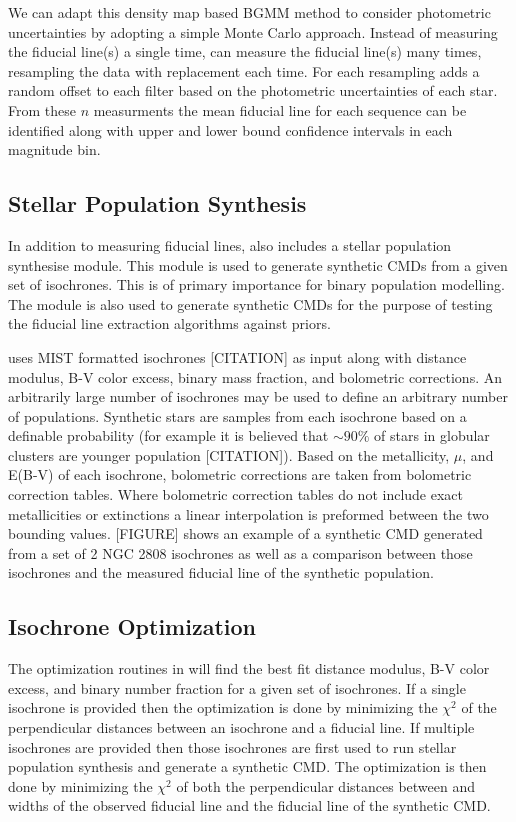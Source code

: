 We can adapt this density map based BGMM method to consider photometric
uncertainties by adopting a simple Monte Carlo approach. Instead of measuring
the fiducial line(s) a single time, \fidanka can measure the fiducial line(s)
many times, resampling the data with replacement each time. For each resampling
\fidanka adds a random offset to each filter based on the photometric
uncertainties of each star. From these $n$ measurments the mean fiducial line
for each sequence can be identified along with upper and lower bound confidence
intervals in each magnitude bin.

\subsection{Stellar Population Synthesis}
In addition to measuring fiducial lines, \fidanka also includes a stellar
population synthesise module. This module is used to generate synthetic CMDs
from a given set of isochrones. This is of primary importance for binary
population modelling. The module is also used to generate synthetic CMDs for
the purpose of testing the fiducial line extraction algorithms against priors.

\fidanka uses MIST formatted isochrones {\color{red}[CITATION]} as input along
with distance modulus, B-V color excess, binary mass fraction, and bolometric
corrections. An arbitrarily large number of isochrones may be used to define an
arbitrary number of populations. Synthetic stars are samples from each
isochrone based on a definable probability (for example it is believed that
$\sim90\%$ of stars in globular clusters are younger population
{\color{red}[CITATION]}). Based on the metallicity, $\mu$, and E(B-V) of each
isochrone, bolometric corrections are taken from bolometric correction tables.
Where bolometric correction tables do not include exact metallicities or
extinctions a linear interpolation is preformed between the two bounding
values. {\color{red}[FIGURE]} shows an example of a synthetic CMD generated
from a set of 2 NGC 2808 isochrones as well as a comparison between those
isochrones and the measured fiducial line of the synthetic population.

\subsection{Isochrone Optimization}
The optimization routines in \fidanka will find the best fit distance modulus,
B-V color excess, and binary number fraction for a given set of isochrones. If
a single isochrone is provided then the optimization is done by minimizing the
$\chi^2$ of the perpendicular distances between an isochrone and a fiducial
line. If multiple isochrones are provided then those isochrones are first used
to run stellar population synthesis and generate a synthetic CMD. The
optimization is then done by minimizing the $\chi^2$ of both the perpendicular
distances between and widths of the observed fiducial line and the fiducial
line of the synthetic CMD.


